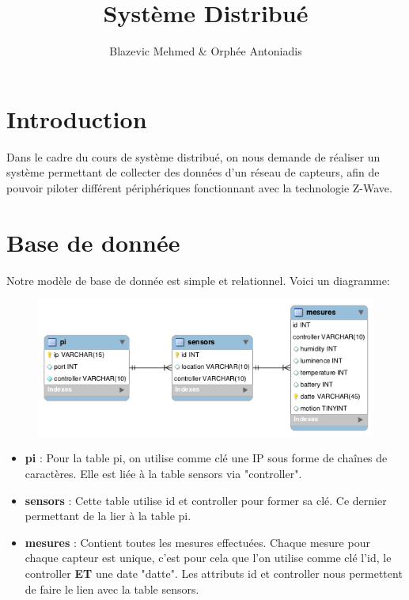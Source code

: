 \documentclass[11pt, oneside]{article}   	%
\title{\huge{\textbf{Système Distribué}}}
\author{Blazevic Mehmed \& Orphée Antoniadis}
\begin{document}
\maketitle
\section{Introduction}
Dans le cadre du cours de système distribué, on nous demande de réaliser un système permettant
de collecter des données d'un réseau de capteurs, afin de pouvoir piloter différent périphériques
fonctionnant avec la technologie Z-Wave.

\newpage
\section{Base de donnée}
Notre modèle de base de donnée est simple et relationnel. Voici un diagramme:

\begin{figure}[!h]
\begin{center}
\includegraphics[scale=0.8]{images/distributed_bdd.png}
\end{center}
\end{figure}

\begin{itemize}
    \item \textbf{pi}   :  Pour la table pi, on utilise comme clé une IP sous forme de chaînes
    de caractères. Elle est liée à la table sensors via "controller".
    \item \textbf{sensors} : Cette table utilise id et controller pour former sa clé. Ce dernier
    permettant de la lier à la table pi.
    \item \textbf{mesures} : Contient toutes les mesures effectuées. Chaque mesure pour chaque
    capteur est unique, c'est pour cela que l'on utilise comme clé l'id, le controller \textbf{ET}
    une date "datte". Les attributs id et controller nous permettent de faire le lien avec la table sensors.

\end{itemize}
\end{document}
